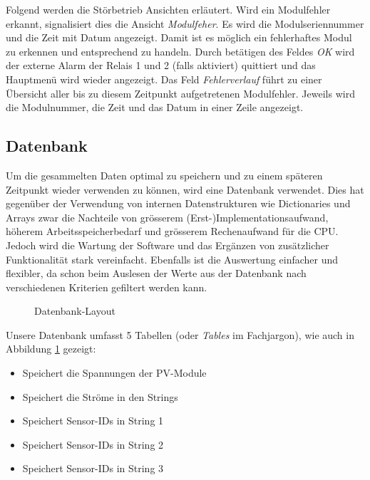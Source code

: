 Folgend werden  die St\"orbetrieb Ansichten erl\"autert. Wird  ein Modulfehler
erkannt,  signalisiert   dies  die  Ansicht  \emph{Modulfeher}. Es   wird  die
Modulseriennummer und die Zeit mit Datum angezeigt. Damit ist es m\"oglich ein
fehlerhaftes Modul zu erkennen  und entsprechend zu handeln. Durch bet\"atigen
des  Feldes  \emph{OK} wird  der  externe  Alarm der  Relais  1  und 2  (falls
aktiviert)  quittiert  und das  Hauptmen\"u  wird  wieder angezeigt. Das  Feld
\emph{Fehlerverlauf}  f\"uhrt  zu  einer   \"Ubersicht  aller  bis  zu  diesem
Zeitpunkt aufgetretenen  Modulfehler. Jeweils wird  die Modulnummer,  die Zeit
und das Datum in einer Zeile angezeigt.


\subsection{Datenbank}
\label{subsec:software:master:database}


Um  die  gesammelten  Daten  optimal  zu speichern  und  zu  einem  sp\"ateren
Zeitpunkt wieder  verwenden zu  k\"onnen, wird eine  Datenbank verwendet. Dies
hat gegen\"uber  der Verwendung von internen  Datenstrukturen wie Dictionaries
und Arrays  zwar die Nachteile von  gr\"osserem (Erst-)Implementationsaufwand,
h\"oherem  Arbeitsspeicherbedarf  und   gr\"osserem  Rechenaufwand  f\"ur  die
CPU. Jedoch   wird  die   Wartung  der   Software  und   das  Erg\"anzen   von
zus\"atzlicher   Funktionalit\"at   stark   vereinfacht. Ebenfalls   ist   die
Auswertung einfacher und  flexibler, da schon beim Auslesen der  Werte aus der
Datenbank nach verschiedenen Kriterien gefiltert werden kann.

\begin{figure}[h!tb]
    \centering
    
    \caption{Datenbank-Layout}
  \label{fig:database:layout}
\end{figure}


Unsere Datenbank  umfasst 5 Tabellen  (oder \emph{Tables} im  Fachjargon), wie
auch in Abbildung \ref{fig:database:layout} gezeigt:

\begin{itemize}
    \tightlist
    \item
         Speichert die Spannungen der PV-Module
    \item
         Speichert die Str\"ome in den Strings
    \item
         Speichert Sensor-IDs in String 1
    \item
         Speichert Sensor-IDs in String 2
    \item
         Speichert Sensor-IDs in String 3
\end{itemize}


